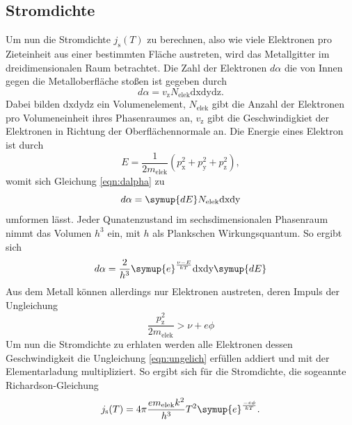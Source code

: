 \subsection{Stromdichte}
Um nun die Stromdichte $j_\text{s}(T)$ zu berechnen, also wie viele Elektronen pro Zieteinheit aus einer bestimmten Fläche austreten, wird das Metallgitter im dreidimensionalen Raum betrachtet.
Die Zahl der Elektronen $d\alpha$ die von Innen gegen die Metalloberfläche stoßen ist gegeben durch
\begin{equation}
    d\alpha = v_\text{z} N_\text{elek}\text{dx} \text{dy} \text{dz}.
    \label{eqn:dalpha}
\end{equation}
Dabei bilden $\text{dx} \text{dy} \text{dz}$ ein Volumenelement, $N_\text{elek}$ gibt die Anzahl der Elektronen pro Volumeneinheit ihres Phasenraumes an, $v_\text{z}$ gibt die Geschwindigkiet der Elektronen in Richtung der Oberflächennormale an.
Die Energie eines Elektron ist durch 
\begin{equation*}
    E = \frac{1}{2m_\text{elek}}\left ( p_\text{x} ^2 + p_\text{y} ^2 + p_\text{z} ^2 \right),
\end{equation*}
womit sich Gleichung \eqref{eqn:dalpha} zu 
\begin{equation*}
d\alpha = \symup{dE} N_\text{elek} \text{dx} \text{dy}
\end{equation*}
umformen lässt.
Jeder Qunatenzustand im sechsdimensionalen Phasenraum nimmt das Volumen $h^3$ ein, mit $h$ als Plankschen Wirkungsquantum.
So ergibt sich 
\begin{equation*}
d\alpha = \frac{2}{h^3}\symup{e} ^{\frac{\nu -E}{kT}} \text{dx} \text{dy} \symup{dE}
\end{equation*}
Aus dem Metall können allerdings nur Elektronen austreten, deren Impuls der Ungleichung
\begin{equation}
    \frac{p_\text{z}^2}{2m_\text{elek}} > \nu + e \phi
    \label{eqn:ungelich}
\end{equation}
Um nun die Stromdichte zu erhlaten werden alle Elektronen dessen Geschwindigkeit die Ungleichung \eqref{eqn:ungelich} erfüllen addiert und mit der Elementarladung multipliziert.
So ergibt sich für die Stromdichte, die sogeannte Richardson-Gleichung
\begin{equation}
    j_\text{s}(T) = 4\pi  \frac{e m_\text{elek}k^2}{h^3} T^2 \symup{e}^{\frac{-e\phi}{kT}}.
    \label{eqn:stromdichte}
\end{equation}
